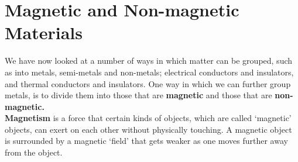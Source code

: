             \section{Magnetic and Non-magnetic Materials}
            \nopagebreak
      \label{m38706*id67151}We have now looked at a number of ways in which matter can be grouped, such as into metals, semi-metals and non-metals; electrical conductors and insulators, and thermal conductors and insulators. One way in which we can further group metals, is to divide them into those that are \textbf{magnetic} and those that are \textbf{non-magnetic.}\\
\textbf{Magnetism} is a force that certain kinds of objects, which are called `magnetic' objects, can exert on each other without physically touching. A magnetic object is surrounded by a magnetic `field' that gets weaker as one moves further away from the object. 

